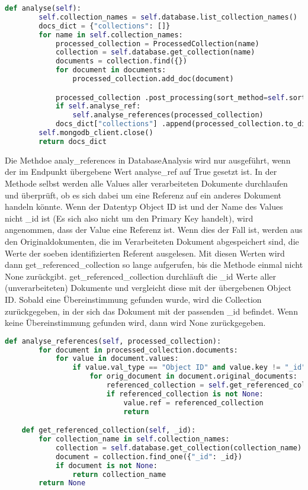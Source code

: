 \begin{lstlisting}[language=python, caption={DatabaseAnalysis.analyse},label={lst:backend_analyse}]
    def analyse(self):
        self.collection_names = self.database.list_collection_names()
        docs_dict = {"collections": []}
        for name in self.collection_names:
            processed_collection = ProcessedCollection(name)
            collection = self.database.get_collection(name)
            documents = collection.find({})
            for document in documents:
                processed_collection.add_doc(document)

            processed_collection .post_processing(sort_method=self.sort_method)
            if self.analyse_ref:
                self.analyse_references(processed_collection)
            docs_dict["collections"] .append(processed_collection.to_dict())
        self.mongodb_client.close()
        return docs_dict
\end{lstlisting}

Die Methdoe analy\_references in DatabaseAnalysis wird nur ausgeführt, wenn der im Endpunkt übergebene Wert analyse\_ref auf True gesetzt ist.
In der Methode selbst werden alle Values aller verarbeiteten Dokumente durchlaufen und überprüft, ob es sich dabei um eine Referenz auf ein anderes Dokument handeln könnte.
Wenn der Datentyp Object ID ist und der Name des Values nicht \_id ist (Es sich also nicht um den Primary Key handelt), wird angenommen, dass der Value eine Referenz ist.
Wenn dies der Fall ist, werden aus den Originaldokumenten, die im Verarbeiteten Dokument abgespeichert sind, die Werte der soeben identifizierten Referent ausgelesen.
Mit diesen Werten wird dann get\_referenced\_collection so lange aufgerufen, bis die Methode einmal nicht None zurückgibt.
get\_referenced\_collection durchläuft die \_id Werte aller (unverarbeiteten) Dokumente und vergleicht diese mit der übergebenen Object ID.
Sobald eine Übereinstimmung gefunden wurde, wird die Collection zurückgegeben, in der sich das Dokument mit der passenden \_id befindet.
Wenn keine Übereinstimmung gefunden wird, dann wird None zurückgegeben.

\begin{lstlisting}[language=python, caption={DatabaseAnalysis.analyse\_references},label={lst:backend_analyse_ref}]
    def analyse_references(self, processed_collection):
        for document in processed_collection.documents:
            for value in document.values:
                if value.val_type == "Object ID" and value.key != "_id":
                    for orig_document in document.original_documents:
                        referenced_collection = self.get_referenced_collection (orig_document.get(value.key))
                        if referenced_collection is not None:
                            value.ref = referenced_collection
                            return

    def get_referenced_collection(self, _id):
        for collection_name in self.collection_names:
            collection = self.database.get_collection(collection_name)
            document = collection.find_one({"_id": _id})
            if document is not None:
                return collection_name
        return None
\end{lstlisting}

